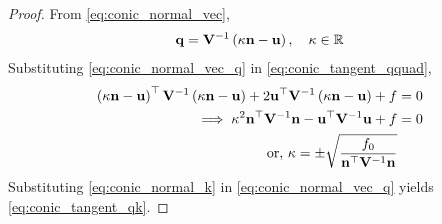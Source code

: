 \documentclass[journal,12pt,onecolumn]{IEEEtran}
\begin{document}
\begin{proof}
  From \eqref{eq:conic_normal_vec},
\begin{align}
\label{eq:conic_normal_vec_q}
 \mathbf{q} = \mathbf{V}^{-1}\left(\kappa \mathbf{n}-\mathbf{u}\right), \quad \kappa \in \mathbb{R}
\end{align}
Substituting \eqref{eq:conic_normal_vec_q}
in \eqref{eq:conic_tangent_qquad},
\begin{align}
\left(\kappa \mathbf{n}-\mathbf{u}\right)^{\top}\mathbf{V}^{-1}\left(\kappa \mathbf{n}-\mathbf{u}\right) 
+ 2\mathbf{u}^{\top}\mathbf{V}^{-1}\left(\kappa \mathbf{n}-\mathbf{u}\right) +f &= 0
\\
\implies 
\kappa^2 \mathbf{n}^{\top}\mathbf{V}^{-1}\mathbf{n} - \mathbf{u}^{\top}\mathbf{V}^{-1}\mathbf{u} + f &=0
 \\
 \text{or, } \kappa = \pm \sqrt{\frac{
	f_0 
 }{\mathbf{n}^{\top}\mathbf{V}^{-1}\mathbf{n}}} &
	\label{eq:conic_normal_k}
\end{align}
%
Substituting \eqref{eq:conic_normal_k} in \eqref{eq:conic_normal_vec_q}
yields \eqref{eq:conic_tangent_qk}.
%
\end{proof}
\end{document}
